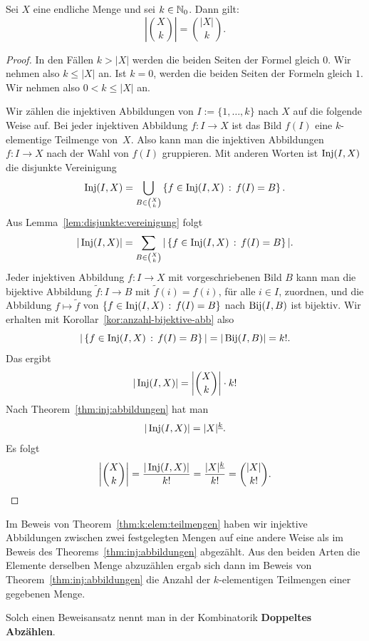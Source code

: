 \begin{thm} \label{thm:k:elem:teilmengen} 
		Sei $X$ eine endliche Menge und sei $k \in \mathbb{N}_0$. Dann gilt: 
		\[
				\left| \binom{X}{k} \right| = \binom{|X|}{k}. 
		\]
\end{thm} 
\begin{proof} 
	In den Fällen $k > |X|$ werden die beiden Seiten der Formel gleich $0$. Wir nehmen also $k \le |X|$ an. Ist $k=0$, werden die beiden Seiten der Formeln gleich $1$. Wir nehmen also $0 < k \le |X|$ an. 
	
	Wir zählen die injektiven Abbildungen von $I:=\{1,\ldots,k\}$ nach $X$ auf die folgende  Weise auf. Bei jeder injektiven Abbildung $f : I \to X$ ist das Bild $f(I)$ eine $k$-elementige Teilmenge von~$X$. Also kann man die injektiven Abbildungen $f: I \to X$  nach der Wahl von $f(I)$ gruppieren. Mit anderen Worten ist $\operatorname{Inj}(I,X)$ die disjunkte Vereinigung
	\[
		\operatorname{Inj}(I,X)  = \bigcup_{B \in \binom{X}{k} } \left\{ f \in \operatorname{Inj}(I,X) \,:\, f(I) = B \right\}. 
	\]
	Aus Lemma~\ref{lem:disjunkte:vereinigung} folgt
	\[
		|\operatorname{Inj}(I,X) | = \sum_{B \in \binom{X}{k} } | \left\{ f \in \operatorname{Inj}(I,X) \,:\, f(I) = B \right\}|. 
	\]
	Jeder injektiven Abbildung $ f: I \to X$ mit vorgeschriebenen Bild $B$ kann man die bijektive Abbildung $\tilde{f} : I \to B$ mit $\tilde{f}(i) = f(i)$, für alle $i \in I$, zuordnen, und die Abbildung $f \mapsto \tilde{f}$ von $\left\{ f \in \operatorname{Inj}(I,X) \,:\, f(I) = B \right\}$ nach $\operatorname{Bij}(I,B)$ ist bijektiv. 
	Wir erhalten mit Korollar~\ref{kor:anzahl-bijektive-abb} also
	\[
			| \left\{ f \in \operatorname{Inj}(I,X) \,:\, f(I) = B \right\}| = |\operatorname{Bij}(I,B)| = k!.
	\]
	Das ergibt
	\[
		|\operatorname{Inj}(I,X) | = \left| \binom{X}{k} \right| \cdot k!
	\]
	Nach Theorem~\ref{thm:inj:abbildungen} hat man 
	\[
		|\operatorname{Inj}(I,X)| = |X|^{\underline{k}}. 
	\]
	Es folgt
	\[
		\left| \binom{X}{k} \right| = \frac{|\operatorname{Inj}(I,X) |}{k!} = \frac{|X|^{\underline{k}}}{k!} = \binom{|X|}{k!}. 
	\]
\end{proof} 

\begin{bem} 
	Im Beweis von Theorem~\ref{thm:k:elem:teilmengen} haben wir injektive Abbildungen zwischen zwei festgelegten Mengen auf eine andere Weise als im Beweis des Theorems~\ref{thm:inj:abbildungen} abgezählt. Aus den beiden Arten die Elemente derselben Menge abzuzählen ergab sich dann im Beweis von Theorem~\ref{thm:inj:abbildungen} die Anzahl der $k$-elementigen Teilmengen einer gegebenen Menge.
	
	Solch einen Beweisansatz nennt man in der Kombinatorik \textbf{Doppeltes Abzählen}. 
\end{bem} 


